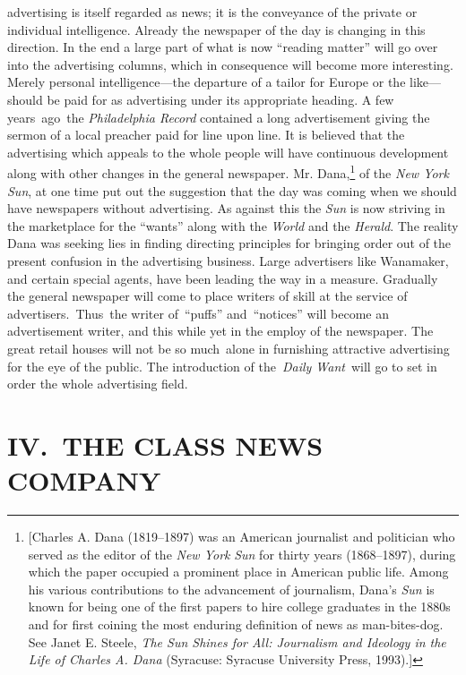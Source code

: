 \documentclass[openany,nobib]{tufte-book}
\begin{document}
advertising is itself regarded as news; it is the conveyance of the
private or individual intelligence. Already the newspaper of the day is
changing in this direction. In the end a large part of what is now
``reading matter'' will go over into the advertising columns, which in
consequence will become more interesting. Merely personal
intelligence---the departure of a tailor for Europe or the like---should
be paid for as advertising under its appropriate heading. A few
years~ago~the \emph{Philadelphia Record} contained a long advertisement
giving the sermon of a local preacher paid for line upon line. It is
believed that the advertising which appeals to the whole people will
have continuous development along with other changes in the general
newspaper. Mr. Dana,\footnote{{[}Charles A. Dana (1819--1897) was an
  American journalist and politician who served as the editor of the
  \emph{New York} \emph{Sun} for thirty years (1868--1897), during which
  the paper occupied a prominent place in American public life. Among
  his various contributions to the advancement of journalism, Dana's
  \emph{Sun} is known for being one of the first papers to hire college
  graduates in the 1880s and for first coining the most enduring
  definition of news as man-bites-dog. See Janet E. Steele, \emph{The
  Sun Shines for All: Journalism and Ideology in the Life of Charles A.
  Dana} (Syracuse: Syracuse University Press, 1993).{]}} of the
\emph{New York Sun}, at one time put out the suggestion that the day was
coming when we should have newspapers without advertising. As against
this the \emph{Sun} is now striving in the marketplace for the ``wants''
along with the \emph{World} and the \emph{Herald}. The reality Dana was
seeking lies in finding directing principles for bringing order out of
the present confusion in the advertising business. Large advertisers
like Wanamaker, and certain special agents, have been leading the way in
a measure. Gradually the general newspaper will come to place writers of
skill at the service of advertisers.~Thus~the writer of~``puffs''
and~``notices'' will become an advertisement writer, and this while yet
in the employ of the newspaper. The great retail houses will not be so
much~alone in furnishing attractive advertising for the eye of the
public. The introduction of the~\emph{Daily Want}~will go to set in
order the whole advertising field.~~

\hypertarget{iv-the-class-news-company}{%
\section{IV.~THE CLASS NEWS
COMPANY}\label{iv-the-class-news-company}}
\end{document}
